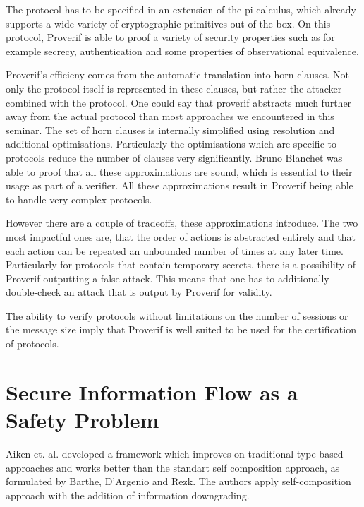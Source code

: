 \documentclass[a4paper,UKenglish]{lipics-v2018}
\begin{document}
The protocol has to be specified in an extension of the pi calculus, which already supports a wide variety of cryptographic primitives out of the box. On this protocol, Proverif is able to proof a variety of security properties such as for example secrecy, authentication and some properties of observational equivalence.\cite{ProVerif}

Proverif's efficieny comes from the automatic translation into horn clauses. Not only the protocol itself is represented in these clauses, but rather the attacker combined with the protocol. One could say that proverif abstracts much further away from the actual protocol than most approaches we encountered in this seminar. The set of horn clauses is internally simplified using resolution and additional optimisations. Particularly the optimisations which are specific to protocols reduce the number of clauses very significantly. Bruno Blanchet was able to proof that all these approximations are sound, which is essential to their usage as part of a verifier. All these approximations result in Proverif being able to handle very complex protocols.\cite{ProVerif}

However there are a couple of tradeoffs, these approximations introduce. The two most impactful ones are, that the order of actions is abstracted entirely and that each action can be repeated an unbounded number of times at any later time. Particularly for protocols that contain temporary secrets, there is a possibility of Proverif outputting a false attack.
This means that one has to additionally double-check an attack that is output by Proverif for validity. \cite{ProVerif}

The ability to verify protocols without limitations on the number of sessions or the message size imply that Proverif is well suited to be used for the certification of protocols.\cite{ProVerif}


\newpage
\section{Secure Information Flow as a Safety Problem}

Aiken et. al. developed a framework which improves on traditional type-based approaches and works better than the standart self composition approach, as formulated by Barthe, D'Argenio and Rezk. The authors apply  self-composition approach with the addition of information downgrading.\cite{secure_information_flow_safety}

\end{document}
